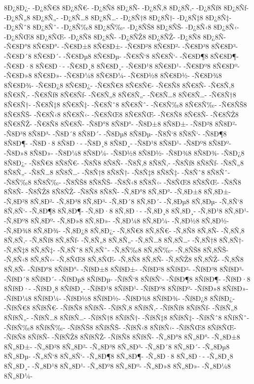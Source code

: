 {8Ð¿8Ð¿-
-Ð¿8Ñ€8
8Ð¿8Ñ€-
-Ð¿8Ñ8
8Ð¿8Ñ-
-Ð¿8Ñ‚8
8Ð¿8Ñ‚-
-Ð¿8Ñƒ8
8Ð¿8Ñƒ-
-Ð¿8Ñ„8
8Ð¿8Ñ„-
-Ð¿8Ñ…8
8Ð¿8Ñ…-
-Ð¿8Ñ†8
8Ð¿8Ñ†-
-Ð¿8Ñ‡8
8Ð¿8Ñ‡-
-Ð¿8Ñˆ8
8Ð¿8Ñˆ-
-Ð¿8Ñ‰8
8Ð¿8Ñ‰-
-Ð¿8ÑŠ8
8Ð¿8ÑŠ-
-Ð¿8Ñ‹8
8Ð¿8Ñ‹-
-Ð¿8ÑŒ8
8Ð¿8ÑŒ-
-Ð¿8Ñ8
8Ð¿8Ñ-
-Ð¿8ÑŽ8
8Ð¿8ÑŽ-
-Ð¿8Ñ8
8Ð¿8Ñ-
-Ñ€8Ð°8
8Ñ€8Ð°-
-Ñ€8Ð±8
8Ñ€8Ð±-
-Ñ€8Ð²8
8Ñ€8Ð²-
-Ñ€8Ð³8
8Ñ€8Ð³-
-Ñ€8Ð´8
8Ñ€8Ð´-
-Ñ€8Ðµ8
8Ñ€8Ðµ-
-Ñ€8Ñ‘8
8Ñ€8Ñ‘-
-Ñ€8Ð¶8
8Ñ€8Ð¶-
-Ñ€8Ð·8
8Ñ€8Ð·-
-Ñ€8Ð¸8
8Ñ€8Ð¸-
-Ñ€8Ð¹8
8Ñ€8Ð¹-
-Ñ€8Ðº8
8Ñ€8Ðº-
-Ñ€8Ð»8
8Ñ€8Ð»-
-Ñ€8Ð¼8
8Ñ€8Ð¼-
-Ñ€8Ð½8
8Ñ€8Ð½-
-Ñ€8Ð¾8
8Ñ€8Ð¾-
-Ñ€8Ð¿8
8Ñ€8Ð¿-
-Ñ€8Ñ€8
8Ñ€8Ñ€-
-Ñ€8Ñ8
8Ñ€8Ñ-
-Ñ€8Ñ‚8
8Ñ€8Ñ‚-
-Ñ€8Ñƒ8
8Ñ€8Ñƒ-
-Ñ€8Ñ„8
8Ñ€8Ñ„-
-Ñ€8Ñ…8
8Ñ€8Ñ…-
-Ñ€8Ñ†8
8Ñ€8Ñ†-
-Ñ€8Ñ‡8
8Ñ€8Ñ‡-
-Ñ€8Ñˆ8
8Ñ€8Ñˆ-
-Ñ€8Ñ‰8
8Ñ€8Ñ‰-
-Ñ€8ÑŠ8
8Ñ€8ÑŠ-
-Ñ€8Ñ‹8
8Ñ€8Ñ‹-
-Ñ€8ÑŒ8
8Ñ€8ÑŒ-
-Ñ€8Ñ8
8Ñ€8Ñ-
-Ñ€8ÑŽ8
8Ñ€8ÑŽ-
-Ñ€8Ñ8
8Ñ€8Ñ-
-Ñ8Ð°8
8Ñ8Ð°-
-Ñ8Ð±8
8Ñ8Ð±-
-Ñ8Ð²8
8Ñ8Ð²-
-Ñ8Ð³8
8Ñ8Ð³-
-Ñ8Ð´8
8Ñ8Ð´-
-Ñ8Ðµ8
8Ñ8Ðµ-
-Ñ8Ñ‘8
8Ñ8Ñ‘-
-Ñ8Ð¶8
8Ñ8Ð¶-
-Ñ8Ð·8
8Ñ8Ð·-
-Ñ8Ð¸8
8Ñ8Ð¸-
-Ñ8Ð¹8
8Ñ8Ð¹-
-Ñ8Ðº8
8Ñ8Ðº-
-Ñ8Ð»8
8Ñ8Ð»-
-Ñ8Ð¼8
8Ñ8Ð¼-
-Ñ8Ð½8
8Ñ8Ð½-
-Ñ8Ð¾8
8Ñ8Ð¾-
-Ñ8Ð¿8
8Ñ8Ð¿-
-Ñ8Ñ€8
8Ñ8Ñ€-
-Ñ8Ñ8
8Ñ8Ñ-
-Ñ8Ñ‚8
8Ñ8Ñ‚-
-Ñ8Ñƒ8
8Ñ8Ñƒ-
-Ñ8Ñ„8
8Ñ8Ñ„-
-Ñ8Ñ…8
8Ñ8Ñ…-
-Ñ8Ñ†8
8Ñ8Ñ†-
-Ñ8Ñ‡8
8Ñ8Ñ‡-
-Ñ8Ñˆ8
8Ñ8Ñˆ-
-Ñ8Ñ‰8
8Ñ8Ñ‰-
-Ñ8ÑŠ8
8Ñ8ÑŠ-
-Ñ8Ñ‹8
8Ñ8Ñ‹-
-Ñ8ÑŒ8
8Ñ8ÑŒ-
-Ñ8Ñ8
8Ñ8Ñ-
-Ñ8ÑŽ8
8Ñ8ÑŽ-
-Ñ8Ñ8
8Ñ8Ñ-
-Ñ‚8Ð°8
8Ñ‚8Ð°-
-Ñ‚8Ð±8
8Ñ‚8Ð±-
-Ñ‚8Ð²8
8Ñ‚8Ð²-
-Ñ‚8Ð³8
8Ñ‚8Ð³-
-Ñ‚8Ð´8
8Ñ‚8Ð´-
-Ñ‚8Ðµ8
8Ñ‚8Ðµ-
-Ñ‚8Ñ‘8
8Ñ‚8Ñ‘-
-Ñ‚8Ð¶8
8Ñ‚8Ð¶-
-Ñ‚8Ð·8
8Ñ‚8Ð·-
-Ñ‚8Ð¸8
8Ñ‚8Ð¸-
-Ñ‚8Ð¹8
8Ñ‚8Ð¹-
-Ñ‚8Ðº8
8Ñ‚8Ðº-
-Ñ‚8Ð»8
8Ñ‚8Ð»-
-Ñ‚8Ð¼8
8Ñ‚8Ð¼-
-Ñ‚8Ð½8
8Ñ‚8Ð½-
-Ñ‚8Ð¾8
8Ñ‚8Ð¾-
-Ñ‚8Ð¿8
8Ñ‚8Ð¿-
-Ñ‚8Ñ€8
8Ñ‚8Ñ€-
-Ñ‚8Ñ8
8Ñ‚8Ñ-
-Ñ‚8Ñ‚8
8Ñ‚8Ñ‚-
-Ñ‚8Ñƒ8
8Ñ‚8Ñƒ-
-Ñ‚8Ñ„8
8Ñ‚8Ñ„-
-Ñ‚8Ñ…8
8Ñ‚8Ñ…-
-Ñ‚8Ñ†8
8Ñ‚8Ñ†-
-Ñ‚8Ñ‡8
8Ñ‚8Ñ‡-
-Ñ‚8Ñˆ8
8Ñ‚8Ñˆ-
-Ñ‚8Ñ‰8
8Ñ‚8Ñ‰-
-Ñ‚8ÑŠ8
8Ñ‚8ÑŠ-
-Ñ‚8Ñ‹8
8Ñ‚8Ñ‹-
-Ñ‚8ÑŒ8
8Ñ‚8ÑŒ-
-Ñ‚8Ñ8
8Ñ‚8Ñ-
-Ñ‚8ÑŽ8
8Ñ‚8ÑŽ-
-Ñ‚8Ñ8
8Ñ‚8Ñ-
-Ñƒ8Ð°8
8Ñƒ8Ð°-
-Ñƒ8Ð±8
8Ñƒ8Ð±-
-Ñƒ8Ð²8
8Ñƒ8Ð²-
-Ñƒ8Ð³8
8Ñƒ8Ð³-
-Ñƒ8Ð´8
8Ñƒ8Ð´-
-Ñƒ8Ðµ8
8Ñƒ8Ðµ-
-Ñƒ8Ñ‘8
8Ñƒ8Ñ‘-
-Ñƒ8Ð¶8
8Ñƒ8Ð¶-
-Ñƒ8Ð·8
8Ñƒ8Ð·-
-Ñƒ8Ð¸8
8Ñƒ8Ð¸-
-Ñƒ8Ð¹8
8Ñƒ8Ð¹-
-Ñƒ8Ðº8
8Ñƒ8Ðº-
-Ñƒ8Ð»8
8Ñƒ8Ð»-
-Ñƒ8Ð¼8
8Ñƒ8Ð¼-
-Ñƒ8Ð½8
8Ñƒ8Ð½-
-Ñƒ8Ð¾8
8Ñƒ8Ð¾-
-Ñƒ8Ð¿8
8Ñƒ8Ð¿-
-Ñƒ8Ñ€8
8Ñƒ8Ñ€-
-Ñƒ8Ñ8
8Ñƒ8Ñ-
-Ñƒ8Ñ‚8
8Ñƒ8Ñ‚-
-Ñƒ8Ñƒ8
8Ñƒ8Ñƒ-
-Ñƒ8Ñ„8
8Ñƒ8Ñ„-
-Ñƒ8Ñ…8
8Ñƒ8Ñ…-
-Ñƒ8Ñ†8
8Ñƒ8Ñ†-
-Ñƒ8Ñ‡8
8Ñƒ8Ñ‡-
-Ñƒ8Ñˆ8
8Ñƒ8Ñˆ-
-Ñƒ8Ñ‰8
8Ñƒ8Ñ‰-
-Ñƒ8ÑŠ8
8Ñƒ8ÑŠ-
-Ñƒ8Ñ‹8
8Ñƒ8Ñ‹-
-Ñƒ8ÑŒ8
8Ñƒ8ÑŒ-
-Ñƒ8Ñ8
8Ñƒ8Ñ-
-Ñƒ8ÑŽ8
8Ñƒ8ÑŽ-
-Ñƒ8Ñ8
8Ñƒ8Ñ-
-Ñ„8Ð°8
8Ñ„8Ð°-
-Ñ„8Ð±8
8Ñ„8Ð±-
-Ñ„8Ð²8
8Ñ„8Ð²-
-Ñ„8Ð³8
8Ñ„8Ð³-
-Ñ„8Ð´8
8Ñ„8Ð´-
-Ñ„8Ðµ8
8Ñ„8Ðµ-
-Ñ„8Ñ‘8
8Ñ„8Ñ‘-
-Ñ„8Ð¶8
8Ñ„8Ð¶-
-Ñ„8Ð·8
8Ñ„8Ð·-
-Ñ„8Ð¸8
8Ñ„8Ð¸-
-Ñ„8Ð¹8
8Ñ„8Ð¹-
-Ñ„8Ðº8
8Ñ„8Ðº-
-Ñ„8Ð»8
8Ñ„8Ð»-
-Ñ„8Ð¼8
8Ñ„8Ð¼-
}
